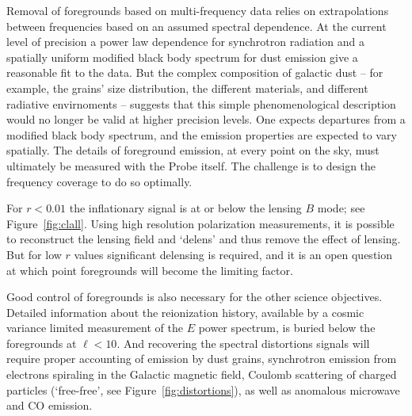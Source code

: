 Removal of foregrounds based on multi-frequency data relies on extrapolations 
between frequencies based on an assumed spectral dependence. At the current level of precision a power law 
dependence for synchrotron radiation and a spatially uniform modified black body spectrum for dust emission 
give a reasonable fit to the data. But the complex composition of galactic dust -- for example, the grains' size distribution, 
the different materials, and different radiative envirnoments -- suggests that this simple phenomenological description 
would no longer be valid at higher precision levels. One expects departures from a modified black 
body spectrum, and the emission properties are expected to vary spatially. 
The details of foreground emission, at every point on the sky, must 
ultimately be measured with the Probe itself. The challenge is to design the frequency 
coverage to do so optimally.  

For $r<0.01$ the inflationary signal is at or below the lensing $B$ mode; see Figure~\ref{fig:clall}. 
Using high resolution polarization measurements, it is possible to reconstruct the lensing field and 
`delens' and thus remove the effect of lensing. But for low $r$ values significant delensing is 
required, and it is an open question at which point foregrounds will become the limiting factor. 

Good control of foregrounds is also necessary for the other science objectives. Detailed information 
about the reionization history, available by a cosmic variance limited measurement of the $E$ power spectrum, 
is buried below the foregrounds at $\ell < 10$. And 
recovering the spectral distortions signals will require proper accounting  of 
emission by dust grains, synchrotron emission from electrons spiraling in the Galactic magnetic 
field, Coulomb scattering of charged particles (`free-free', see Figure~\ref{fig:distortions}), 
as well as anomalous microwave and CO emission.   



